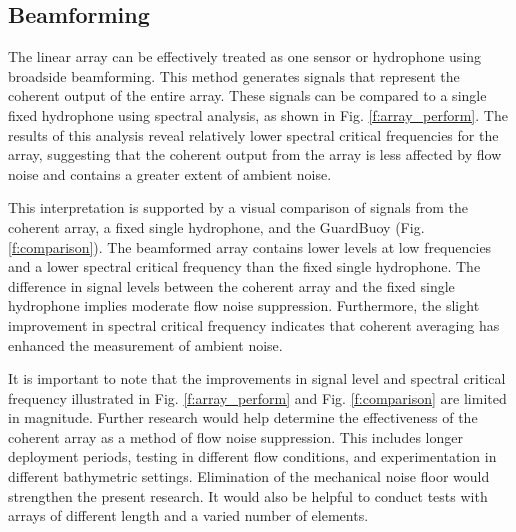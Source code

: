 \documentclass[12pt,journal,onecolumn]{IEEEtran}
\begin{document}
\subsection{Beamforming}
The linear array can be effectively treated as one sensor or hydrophone using broadside beamforming. This method generates signals that represent the coherent output of the entire array. These signals can be compared to a single fixed hydrophone using spectral analysis, as shown in Fig. \ref{f:array_perform}. The results of this analysis reveal relatively lower spectral critical frequencies for the array, suggesting that the coherent output from the array is less affected by flow noise and contains a greater extent of ambient noise. 

This interpretation is supported by a visual comparison of signals from the coherent array, a fixed single hydrophone, and the GuardBuoy (Fig. \ref{f:comparison}). The beamformed array contains lower levels at low frequencies and a lower spectral critical frequency than the fixed single hydrophone. The difference in signal levels between the coherent array and the fixed single hydrophone implies moderate flow noise suppression. Furthermore, the slight improvement in spectral critical frequency indicates that coherent averaging has enhanced the measurement of ambient noise. 
 


It is important to note that the improvements in signal level and spectral critical frequency illustrated in Fig. \ref{f:array_perform} and Fig. \ref{f:comparison} are limited in magnitude. Further research would help determine the effectiveness of the coherent array as a method of flow noise suppression. This includes longer deployment periods, testing in different flow conditions, and experimentation in different bathymetric settings. Elimination of the mechanical noise floor would strengthen the present research. It would also be helpful to conduct tests with arrays of different length and a varied number of elements.
\end{document}
